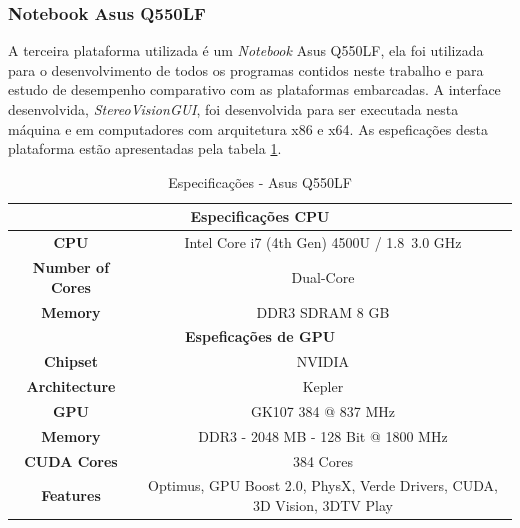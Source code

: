 \subsubsection{Notebook Asus Q550LF}

A terceira plataforma utilizada é um \textit{Notebook} Asus Q550LF, ela foi utilizada para o desenvolvimento de todos os programas contidos neste trabalho e para estudo de desempenho comparativo com as plataformas embarcadas. A interface desenvolvida, \textit{StereoVisionGUI}, foi desenvolvida para ser executada nesta máquina e em computadores com arquitetura x86 e x64. As espeficações desta plataforma estão apresentadas pela tabela \ref{asusQ550LF}.

\begin{table}[]
\centering
\caption{Especificações - Asus Q550LF}
\label{asusQ550LF}
\begin{tabular}{|c|c|}
\hline
\multicolumn{2}{|c|}{\textbf{Especificações CPU}}                                                   \\ \hline
\textbf{CPU}             & Intel Core i7 (4th Gen) 4500U / 1.8~3.0 GHz                              \\ \hline
\textbf{Number of Cores} & Dual-Core                                                                \\ \hline
\textbf{Memory}          & DDR3 SDRAM 8 GB                                                          \\ \hline
\multicolumn{2}{|c|}{\textbf{Espeficações de GPU}}                                                  \\ \hline
\textbf{Chipset}         & NVIDIA                                                                   \\ \hline
\textbf{Architecture}    & Kepler                                                                   \\ \hline
\textbf{GPU}             & GK107 384 @ 837 MHz                                                      \\ \hline
\textbf{Memory}          & DDR3 - 2048 MB - 128 Bit @ 1800 MHz                                      \\ \hline
\textbf{CUDA Cores}      & 384 Cores                                                                \\ \hline
\textbf{Features}        & Optimus, GPU Boost 2.0, PhysX, Verde Drivers, CUDA, 3D Vision, 3DTV Play \\ \hline
\end{tabular}
\end{table}


